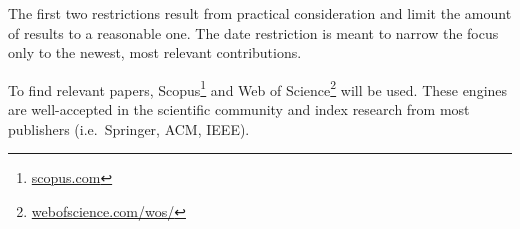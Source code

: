 The first two restrictions result from practical consideration and limit the amount of results to a reasonable one.
The date restriction is meant to narrow the focus only to the newest, most relevant contributions.

To find relevant papers, Scopus\footnote{\url{scopus.com}} and Web of Science\footnote{\url{webofscience.com/wos/}} will be used.
These engines are well-accepted in the scientific community and index research from most publishers (i.e.\ Springer, ACM, IEEE).
